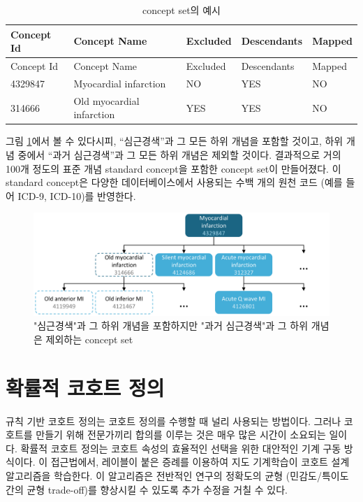 \documentclass[10.5pt]{book}
\theoremstyle{definition}
\theoremstyle{definition}
\theoremstyle{definition}
\theoremstyle{remark}
\begin{document}
\begin{longtable}[]{@{}lllll@{}}
\caption{\label{tab:conceptSetExpression} concept set의 예시}\tabularnewline
\toprule
Concept Id & Concept Name & Excluded & Descendants &
Mapped\tabularnewline
\midrule
\endfirsthead
\toprule
Concept Id & Concept Name & Excluded & Descendants &
Mapped\tabularnewline
\midrule
\endhead
4329847 & Myocardial infarction & NO & YES & NO\tabularnewline
314666 & Old myocardial infarction & YES & YES & NO\tabularnewline
\bottomrule
\end{longtable}

그림 \ref{fig:conceptSet}에서 볼 수 있다시피, ``심근경색''과 그 모든
하위 개념을 포함할 것이고, 하위 개념 중에서 ``과거 심근경색''과 그 모든
하위 개념은 제외할 것이다. 결과적으로 거의 100개 정도의 표준 개념
standard concept을 포함한 concept set이 만들어졌다. 이 standard
concept은 다양한 데이터베이스에서 사용되는 수백 개의 원천 코드 (예를
들어 ICD-9, ICD-10)를 반영한다.

\begin{figure}

{\centering \includegraphics[width=1\linewidth]{images/Cohorts/conceptSet} 

}

\caption{"심근경색"과 그 하위 개념을 포함하지만 "과거 심근경색"과 그 하위 개념은 제외하는 concept set}\label{fig:conceptSet}
\end{figure}

\section{확률적 코호트 정의}\label{--}

규칙 기반 코호트 정의는 코호트 정의를 수행할 때 널리 사용되는 방법이다.
그러나 코호트를 만들기 위해 전문가끼리 합의를 이루는 것은 매우 많은
시간이 소요되는 일이다. 확률적 코호트 정의는 코호트 속성의 효율적인
선택을 위한 대안적인 기계 구동 방식이다. 이 접근법에서, 레이블이 붙은
증례를 이용하여 지도 기계학습이 코호트 설계 알고리즘을 학습한다. 이
알고리즘은 전반적인 연구의 정확도의 균형 (민감도/특이도 간의 균형
trade-off)를 향상시킬 수 있도록 추가 수정을 거칠 수 있다.
\end{document}
